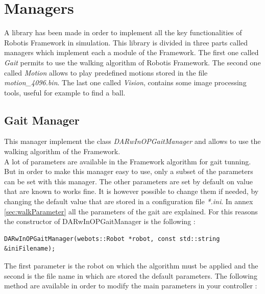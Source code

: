 \documentclass[a4paper, 12pt]{article}  		%
\begin{document}

\newpage
\section{Managers}

A library has been made in order to implement all the key functionalities of Robotis Framework in simulation. This library is divided in three parts called managers which implement each a module of the Framework. The first one called \textit{Gait} permits to use the walking algorithm of Robotis Framework. The second one called \textit{Motion} allows to play predefined motions stored in the file \textit{motion\_4096.bin}. The last one called \textit{Vision}, contains some image processing tools, useful for example to find a ball.\\

\subsection{Gait Manager}
This manager implement the class \textit{DARwInOPGaitManager} and allows to use the walking algorithm of the Framework.\\

A lot of parameters are available in the Framework algorithm for gait tunning. But in order to make this manager easy to use, only a subset of the parameters can be set with this manager. The other parameters are set by default on value that are known to works fine. It is however possible to change them if needed, by changing the default value that are stored in a configuration file \textit{*.ini}. In annex \ref{sec:walkParameter} all the parameters of the gait are explained. For this reasons the constructor of DARwInOPGaitManager is the following :\\

\lstset{language=c++} 
\lstset{commentstyle=\textit} 
\begin{lstlisting} 
DARwInOPGaitManager(webots::Robot *robot, const std::string &iniFilename);
\end{lstlisting}

The first parameter is the robot on which the algorithm must be applied and the second is the file name in which are stored the default parameters. The following method are available in order to modify the main parameters in your controller :\\
\end{document}
